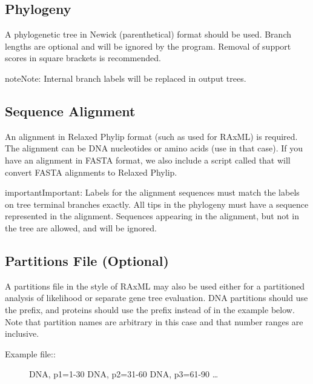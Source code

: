 \documentclass[letterpaper,12pt,english]{sphinxmanual}
\begin{document}
\subsection{Phylogeny}
\label{\detokenize{intro:phylogeny}}
A phylogenetic tree in Newick (parenthetical) format should be used.  Branch lengths are optional and will be ignored by the program.  Removal of support scores in square brackets is recommended.

\begin{sphinxadmonition}{note}{Note:}
Internal branch labels will be replaced in output trees.
\end{sphinxadmonition}


\subsection{Sequence Alignment}
\label{\detokenize{intro:sequence-alignment}}
An alignment in Relaxed Phylip format (such as used for RAxML) is required.  The alignment can be DNA nucleotides or amino acids (use  in that case). If you have an alignment in FASTA format, we also include a script called  that will convert FASTA alignments to Relaxed Phylip.

\begin{sphinxadmonition}{important}{Important:}
Labels for the alignment sequences must match the labels on tree terminal branches exactly. All tips in the phylogeny must have a sequence represented in the alignment.  Sequences appearing in the alignment, but not in the tree are allowed, and will be ignored.
\end{sphinxadmonition}


\subsection{Partitions File (Optional)}
\label{\detokenize{intro:partitions-file-optional}}
A partitions file in the style of RAxML may also be used either for a partitioned analysis of likelihood or separate gene tree evaluation.  DNA partitions should use the  prefix, and proteins should use the  prefix instead of  in the example below.  Note that partition names are arbitrary in this case and that number ranges are inclusive.
\begin{description}
\item[{Example file::}] \leavevmode
DNA, p1=1-30
DNA, p2=31-60
DNA, p3=61-90
…

\end{description}
\end{document}
